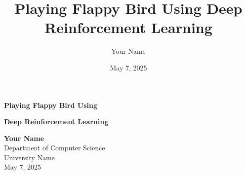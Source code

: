 \documentclass[a1paper,portrait]{article}
\title{\Huge\textbf{Playing Flappy Bird Using Deep Reinforcement Learning}}
\author{\Large Your Name}
\date{May 7, 2025}
\begin{document}
\thispagestyle{empty}

\begin{center}
\textcolor{headerblue}{\VERYHuge\textbf{Playing Flappy Bird Using}}
\vspace{0.5cm}

\textcolor{headerblue}{\VERYHuge\textbf{Deep Reinforcement Learning}}
\vspace{1cm}

\Large\textbf{Your Name}\\
\large Department of Computer Science\\
\large University Name\\
\large May 7, 2025
\end{center}

\vspace{1cm}
\end{document}
